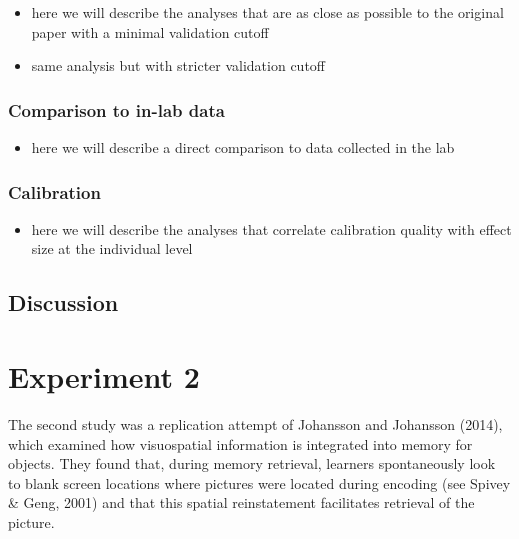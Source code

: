 \documentclass[
  man,floatsintext]{apa6}
\providecommand{\tightlist}{%
  \setlength{\itemsep}{0pt}\setlength{\parskip}{0pt}}
\begin{document}
\begin{itemize}
\item
  here we will describe the analyses that are as close as possible to
  the original paper with a minimal validation cutoff
\item
  same analysis but with stricter validation cutoff
\end{itemize}

\hypertarget{comparison-to-in-lab-data}{%
\subsubsection{Comparison to in-lab data}\label{comparison-to-in-lab-data}}

\begin{itemize}
\tightlist
\item
  here we will describe a direct comparison to data collected in the
  lab
\end{itemize}

\hypertarget{calibration}{%
\subsubsection{Calibration}\label{calibration}}

\begin{itemize}
\tightlist
\item
  here we will describe the analyses that correlate calibration
  quality with effect size at the individual level
\end{itemize}

\hypertarget{discussion}{%
\subsection{Discussion}\label{discussion}}

\hypertarget{experiment-2}{%
\section{Experiment 2}\label{experiment-2}}

The second study was a replication attempt of Johansson and Johansson (2014),
which examined how visuospatial information is integrated into memory
for objects. They found that, during memory retrieval, learners
spontaneously look to blank screen locations where pictures were located
during encoding (see Spivey \& Geng, 2001) and that
this spatial reinstatement facilitates retrieval of the picture.
\end{document}
